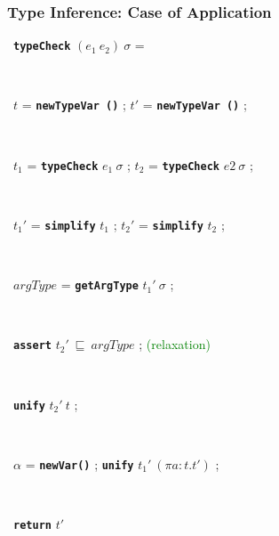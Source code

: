 \documentclass[handout,t]{beamer}
\def\mytt#1{\texttt{\textbf{#1}}}
\begin{document}
\begin{frame}
\frametitle{Type Inference: Case of Application}


\vspace{0.2cm}\small

~\hspace{0.5cm}\mytt{typeCheck} $(e_1\ e_2)\ \sigma$ =

~

~\hspace{1.5cm}$t$ = \mytt{newTypeVar ()} ; $t'$ = \mytt{newTypeVar ()} ;

~

~\hspace{1.5cm}$t_1$ = \mytt{typeCheck} $e_1\ \sigma$ ; $t_2$ = \mytt{typeCheck} $e2\ \sigma$ ;

~

~\hspace{1.5cm}$t_1'$ = \mytt{simplify} $t_1$ ; $t_2'$ = \mytt{simplify} $t_2$ ;

~

~\hspace{1.5cm}$argType$ = \mytt{getArgType} $t_1'\ \sigma$ ;

~

~\hspace{1.5cm}\mytt{assert} $t_2' \ \sqsubseteq\ argType$ ; \quad \textcolor{green}{(relaxation)}

~

~\hspace{1.5cm}\mytt{unify} $t_2'\ t$ ;

~

~\hspace{1.5cm}$\alpha$ = \mytt{newVar()} ; \mytt{unify} $t_1'\ (\pi a : t.t')$ ; 

~

~\hspace{1.5cm}\mytt{return} $t'$



\end{frame}
\end{document}
